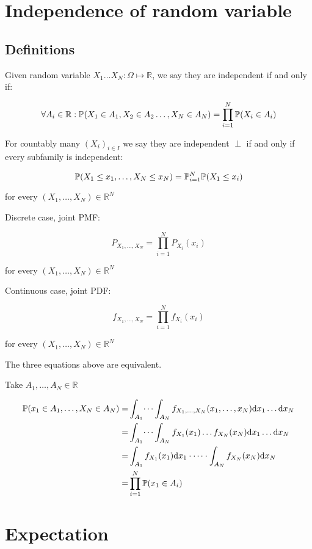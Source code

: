 \section{Independence of random variable}

\subsection{Definitions}

Given random variable $X_1\dots X_N:\Omega\mapsto \mathbb{R}$, we say they are independent if and only if:

$$
\forall A_i\in \mathbb{R}:
\mathbb{P}( X_1\in A_1, X_2\in A_2\dots, X_N\in A_N )=\prod_{i=1}^{N}\mathbb{P}(X_i\in A_i)
$$

For countably many $(X_i)_{i\in I}$ we say they are independent $\perp$ if and only if every subfamily is independent:

$$
\mathbb{P}(X_1\leq x_1,\dots,X_N\leq x_N)=\mathbb{P}_{i=1}^{N}\mathbb{P}(X_1\leq x_i)
$$

for every $(X_1,\dots,X_N)\in\mathbb{R}^N$

\bigskip

Discrete case, joint PMF:

$$
P_{X_1,\dots,X_N}=\prod_{i=1}^{N}P_{X_i}(x_i)
$$

for every $(X_1,\dots,X_N)\in\mathbb{R}^N$

\bigskip

Continuous case, joint PDF:

$$
f_{X_1,\dots,X_N}=\prod_{i=1}^{N}f_{X_i}(x_i)
$$

for every $(X_1,\dots,X_N)\in\mathbb{R}^N$

The three equations above are equivalent.

\bigskip

Take $A_1,\dots,A_N\in\mathbb{R}$

\begin{align*}
\mathbb{P}(x_1\in A_1,\dots,X_N\in A_N)
=&
\int_{A_1}\dots\int_{A_N}f_{X_1,\dots,X_N}(x_1,\dots,x_N)\text{d}x_1\dots\text{d}x_N
\\=&
\int_{A_1}\dots\int_{A_N} f_{X_1}(x_1)\dots f_{X_N}(x_N)\text{d}x_1\dots\text{d}x_N
\\=&
\int_{A_1}f_{X_1}(x_1)\text{d}x_1\cdot\dots\cdot \int_{A_N}f_{X_N}(x_N)\text{d}x_N
\\=&
\prod_{i=1}^{N}\mathbb{P}(x_1\in A_i)
\end{align*}

\section{Expectation}

